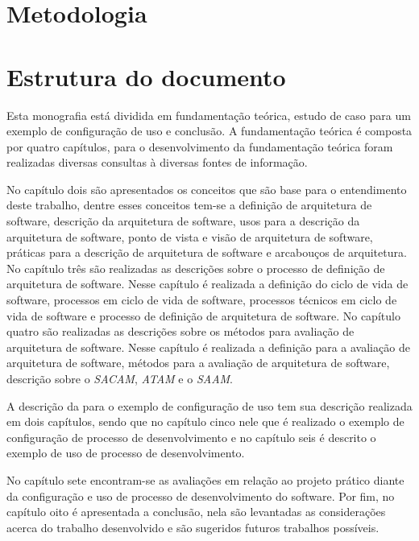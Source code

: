 \section{Metodologia}
\section{Estrutura do documento}

Esta monografia está dividida em fundamentação teórica, estudo de caso para um exemplo de configuração de uso e conclusão.
A fundamentação teórica é composta por quatro capítulos, para o desenvolvimento da fundamentação teórica foram realizadas diversas consultas à diversas fontes de informação.

No capítulo dois são apresentados os conceitos que são base para o entendimento deste trabalho, dentre esses conceitos tem-se a definição de arquitetura de software, descrição da arquitetura de software, usos para a descrição da arquitetura de software, ponto de vista e visão de arquitetura de software, práticas para a descrição de arquitetura de software e arcabouços de arquitetura.
No capítulo três são realizadas as descrições sobre o processo de definição de arquitetura de software. Nesse capítulo é realizada a definição do ciclo de vida de software, processos em ciclo de vida de software, processos técnicos em ciclo de vida de software e processo de definição de arquitetura de software.
No capítulo quatro são realizadas as descrições sobre os métodos para avaliação de arquitetura de software. Nesse capítulo é realizada a definição para a avaliação de arquitetura de software, métodos para a avaliação de arquitetura de software, descrição sobre o \emph{\acrfull{SACAM}}, \emph{\acrfull{ATAM}} e o \emph{\acrfull{SAAM}}. 

A descrição da para o exemplo de configuração de uso tem sua descrição realizada em dois capítulos, sendo que no capítulo cinco nele que é realizado o exemplo de configuração de processo de desenvolvimento e no capítulo seis é descrito o exemplo de uso de processo de desenvolvimento.

No capítulo sete encontram-se as avaliações em relação ao projeto prático diante da configuração e uso de processo de desenvolvimento do software. Por fim, no capítulo oito é apresentada a conclusão, nela são levantadas as considerações acerca do trabalho desenvolvido e são sugeridos futuros trabalhos possíveis.